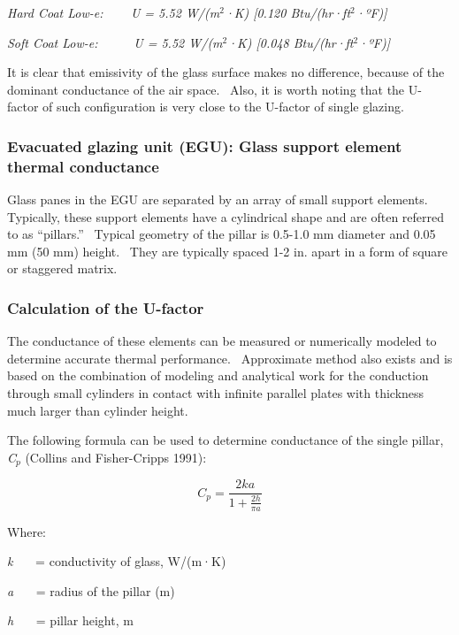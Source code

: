 \emph{Hard Coat Low-e: ~~~ U = 5.52 W/(m\(^{2}\)·K) {[}0.120 Btu/(hr·ft\(^{2}\)·ºF){]}}

\emph{Soft Coat Low-e:~~~~~ U = 5.52 W/(m\(^{2}\)·K) {[}0.048 Btu/(hr·ft\(^{2}\)·ºF){]}}

It is clear that emissivity of the glass surface makes no difference, because of the dominant conductance of the air space.~ Also, it is worth noting that the U-factor of such configuration is very close to the U-factor of single glazing.

\subsubsection{Evacuated glazing unit (EGU): Glass support element thermal conductance}\label{evacuated-glazing-unit-egu-glass-support-element-thermal-conductance}

Glass panes in the EGU are separated by an array of small support elements.~ Typically, these support elements have a cylindrical shape and are often referred to as ``pillars.''~ Typical geometry of the pillar is 0.5-1.0 mm diameter and 0.05 mm (50 mm) height.~ They are typically spaced 1-2 in. apart in a form of square or staggered matrix.

\subsubsection{Calculation of the U-factor}\label{calculation-of-the-u-factor}

The conductance of these elements can be measured or numerically modeled to determine accurate thermal performance.~ Approximate method also exists and is based on the combination of modeling and analytical work for the conduction through small cylinders in contact with infinite parallel plates with thickness much larger than cylinder height.

The following formula can be used to determine conductance of the single pillar, \emph{C}\(_{p}\) (Collins and Fisher-Cripps 1991):

\begin{equation}
{C_p} = \frac{{2ka}}{{1 + \frac{{2h}}{{\pi a}}}}
\end{equation}

Where:

\emph{k}~~~ = conductivity of glass, W/(m·K)

\emph{a}~~~ = radius of the pillar (m)

\emph{h}~~~ = pillar height, m

